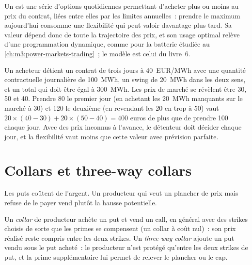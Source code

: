 Un  est une série d'options quotidiennes permettant d'acheter plus ou moins au prix du contrat, liées entre elles par les
limites annuelles~: prendre le maximum aujourd'hui consomme une flexibilité qui peut valoir davantage plus tard. Sa valeur
dépend donc de toute la trajectoire des prix, et son usage optimal relève d'une programmation dynamique,
comme pour la batterie étudiée au \cref{ch:m3:power-markets-trading}~; le modèle est celui du livre~6.

\begin{example}\label{ex:m3:commodity-options-and-structured-hedges:swing}
Un acheteur détient un contrat de trois jours à \qty{40}{EUR/MWh} avec une quantité contractuelle journalière de 100~MWh, un swing de
20~MWh dans les deux sens, et un total qui doit être égal à 300~MWh. Les prix de marché se révèlent être 30, 50 et 40. Prendre 80
le premier jour (en achetant les 20~MWh manquants sur le marché à 30) et 120 le deuxième (en revendant les 20 en trop à
50) vaut $20 \times (40 - 30) + 20 \times (50 - 40) = 400$ euros de plus que de prendre 100 chaque jour. Avec
des prix inconnus à l'avance, le détenteur doit décider chaque jour, et la flexibilité vaut moins que cette
valeur avec prévision parfaite.
\end{example}

\section{Collars et three-way collars}

Les puts coûtent de l'argent. Un producteur qui veut un plancher de prix mais refuse de le payer vend plutôt la hausse potentielle.

\begin{definition}\label{def:m3:commodity-options-and-structured-hedges:collar}
Un \emph{collar} de producteur achète un put et vend un call, en général avec des strikes choisis de sorte que
les primes se compensent (un collar à coût nul)~: son prix réalisé reste compris entre les deux strikes. Un
\emph{three-way collar} ajoute un put vendu sous le put acheté~: le producteur n'est
protégé qu'entre les deux strikes de put, et la prime supplémentaire lui permet de relever le plancher ou le cap.
\end{definition}

